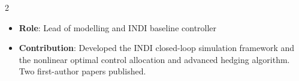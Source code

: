 \documentclass[10pt,a4paper,ragged2e,withhyper]{altacv}
\begin{document}
\begin{paracol}{2}
            \begin{itemize} \justifying
                \item \textbf{Role}: Lead of modelling and INDI baseline controller
                \item \textbf{Contribution}: Developed the INDI closed-loop simulation framework and the nonlinear optimal control allocation and advanced hedging algorithm. Two first-author papers published.
            \end{itemize}
            \bigskip
        
        \nocite{*} %
        \printbibliography[heading=none]

        
    \end{paracol}  
    
\end{document}
